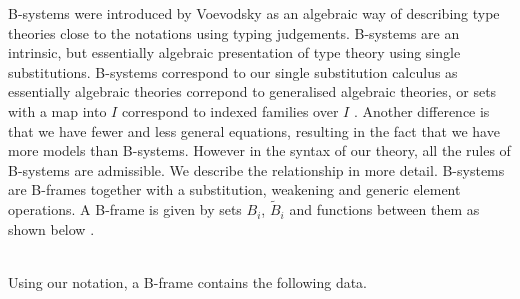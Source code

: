 \documentclass[sigplan,10pt,anonymous,review]{acmart}\settopmatter{printfolios=true,printccs=false,printacmref=false}
\newcommand{\Ty}{\mathsf{Ty}}
\newcommand{\Tm}{\mathsf{Tm}}
\newcommand{\ext}{\mathop{\triangleright}}
\begin{document}
B-systems were introduced by Voevodsky \cite{voevodsky2014bsystems} as
an algebraic way of describing type theories close to the notations
using typing judgements. B-systems are an intrinsic, but essentially
algebraic presentation of type theory using single
substitutions. B-systems correspond to our single substitution
calculus as essentially algebraic theories correpond to generalised
algebraic theories, or sets with a map into $I$ correspond to indexed
families over $I$ \cite[page
  221]{DBLP:journals/apal/Cartmell86}. Another difference is that we
have fewer and less general equations, resulting in the fact that we
have more models than B-systems. However in the syntax of our theory,
all the rules of B-systems are admissible. We describe the
relationship in more detail. B-systems are B-frames together with a
substitution, weakening and generic element operations. A B-frame is
given by sets $B_i$, $\tilde{B}_i$ and functions between them as shown
below \cite{AHRENS_EMMENEGGER_NORTH_RIJKE_2023}. \\
 \\
Using our notation, a B-frame contains the following data. \\
 \\
\end{document}
